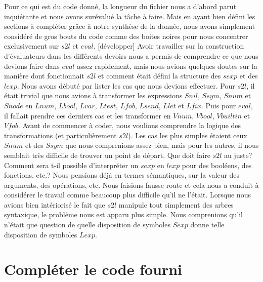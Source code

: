 \documentclass{article}
\begin{document}
Pour ce qui est du code donné, la longueur du fichier nous a d'abord parut inquiétante et nous avons surévalué la tâche à faire. Mais en ayant bien défini les sections à compléter grâce à notre synthèse de la donnée, nous avons simplement considéré de gros bouts du code comme des boites noires pour nous concentrer exclusivement sur $s2l$ et $eval$. [développer] Avoir travailler sur la construction d'évaluateurs dans les différents devoirs nous a permis de comprendre ce que nous devions faire dans $eval$ assez rapidement, mais nous avions quelques doutes sur la manière dont fonctionnait $s2l$ et comment était défini la structure des $sexp$ et des $lexp$. Nous avons débuté par lister les cas que nous devions effectuer. Pour $s2l$, il était trivial que nous avions à transformer les expressions $Snil$, $Ssym$, $Snum$ et $Snode$ en $Lnum$, $Lbool$, $Lvar$, $Ltest$, $Lfob$, $Lsend$, $Llet$ et $Lfix$. Puis pour $eval$, il fallait prendre ces derniers cas et les transformer en $Vnum$, $Vbool$, $Vbuiltin$ et $Vfob$. Avant de commencer à coder, nous voulions comprendre la logique des transformations (et particulièrement $s2l$). Les cas les plus simples étaient ceux $Snum$ et des $Ssym$ que nous comprenions assez bien, mais pour les autres, il nous semblait très difficile de trouver un point de départ. Que doit faire $s2l$ au juste? Comment sera t-il possible d'interpréter un $sexp$ en $lexp$ pour des booléens, des fonctions, etc.? Nous pensions déjà en termes sémantiques, sur la valeur des arguments, des opérations, etc. Nous faisions fausse route et cela nous a conduit à considérer le travail comme beaucoup plus difficile qu'il ne l'était.  Lorsque nous avions bien intériorisé le fait que $s2l$ manipule tout simplement des arbres syntaxique, le problème nous est apparu plus simple. Nous comprenions qu'il n'était que question de quelle disposition de symboles $Sexp$ donne telle disposition de symboles $Lexp$. 

\section{Compléter le code fourni}
\end{document}
